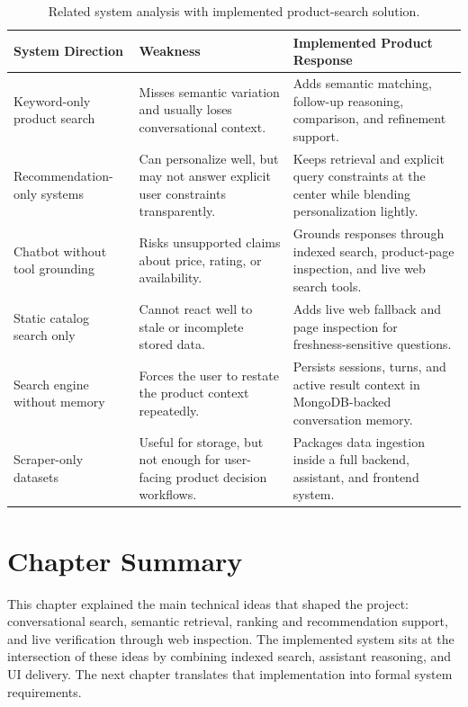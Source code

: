 \documentclass[12pt,a4paper,oneside]{report}
\begin{document}
\begin{table}[H]
\centering
\small
\setlength{\tabcolsep}{4pt}
\renewcommand{\arraystretch}{1.08}
\caption{Related system analysis with implemented product-search solution.}
\label{tab:related-analysis}
\begin{tabular}{|L{0.20\textwidth}|L{0.29\textwidth}|L{0.31\textwidth}|}
\hline
\textbf{System Direction} & \textbf{Weakness} & \textbf{Implemented Product Response} \\
\hline
Keyword-only product search & Misses semantic variation and usually loses conversational context. & Adds semantic matching, follow-up reasoning, comparison, and refinement support. \\
\hline
Recommendation-only systems & Can personalize well, but may not answer explicit user constraints transparently. & Keeps retrieval and explicit query constraints at the center while blending personalization lightly. \\
\hline
Chatbot without tool grounding & Risks unsupported claims about price, rating, or availability. & Grounds responses through indexed search, product-page inspection, and live web search tools. \\
\hline
Static catalog search only & Cannot react well to stale or incomplete stored data. & Adds live web fallback and page inspection for freshness-sensitive questions. \\
\hline
Search engine without memory & Forces the user to restate the product context repeatedly. & Persists sessions, turns, and active result context in MongoDB-backed conversation memory. \\
\hline
Scraper-only datasets & Useful for storage, but not enough for user-facing product decision workflows. & Packages data ingestion inside a full backend, assistant, and frontend system. \\
\hline
\end{tabular}
\end{table}

\section{Chapter Summary}
This chapter explained the main technical ideas that shaped the project: conversational search, semantic retrieval, ranking and recommendation support, and live verification through web inspection. The implemented system sits at the intersection of these ideas by combining indexed search, assistant reasoning, and UI delivery. The next chapter translates that implementation into formal system requirements.
\end{document}
